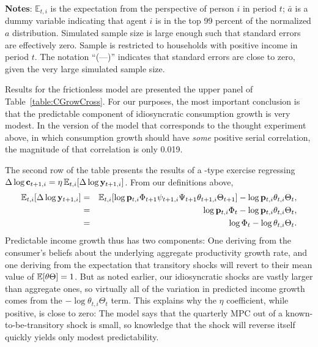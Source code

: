 \documentclass[titlepage]{./econtex}
\newlength\TableWidth
\begin{document}
\begin{minipage}{\TableWidth}
\begin{table}
\begin{flushleft}
  \footnotesize \textbf{Notes}: $\mathbb{E}_{t,i}$ is the expectation from the perspective of person $i$ in period $t$; $\bar{a}$ is a dummy variable indicating that agent $i$ is in the top 99 percent of the normalized $a$ distribution.  Simulated sample size is large enough such that standard errors are effectively zero.  Sample is restricted to households with positive income in period $t$. The notation ``(---)'' indicates that standard errors are close to zero, given the very large simulated sample size.\normalsize
\end{flushleft}

\medskip\medskip
\end{table}
\end{minipage}
 Results for the frictionless model are presented the upper panel of Table~\ref{table:CGrowCross}.
For our purposes, the most important conclusion is that the predictable component of idiosyncratic consumption growth is very modest.  In the version of the model that corresponds to the thought experiment above, in which consumption growth should have {\it some} positive serial correlation, the magnitude of that correlation is only 0.019. 

The second row of the table presents the results of a \cite{cmModel}-type exercise regressing $\Delta \log \mathbf{c}_{t+1,i} = \eta \operatorname{\mathbb{E}}_{t,i}[\Delta \log \mathbf{y}_{t+1,i}]$.  From our definitions above,
\begin{eqnarray*}
  \operatorname{\mathbb{E}}_{t,i}[\Delta \log \mathbf{y}_{t+1,i}] & = & \operatorname{\mathbb{E}}_{t,i}[\log \mathbf{p}_{t,i}\Phi_{t+1}\psi_{t+1,i}\Psi_{t+1}\theta_{t+1,i}\Theta_{t+1}] - \log \mathbf{p}_{t,i}\theta_{t,i}\Theta_{t},
  \\ & = & \log \mathbf{p}_{t,i}\Phi_{t} - \log \mathbf{p}_{t,i}\theta_{t,i}\Theta_{t},
   \\ & = & \log \Phi_{t} - \log \theta_{t,i}\Theta_{t}.
\end{eqnarray*}
Predictable income growth thus has two components: One deriving from the consumer's beliefs about the underlying aggregate productivity growth rate, and one deriving from the expectation that transitory shocks will revert to their mean value of $\operatorname{\mathbb{E}}[\theta \Theta]=1$.  But as noted earlier, our idiosyncratic shocks are vastly larger than aggregate ones, so virtually all of the variation in predicted income growth comes from the $-\log \theta_{t,i}\Theta_{t}$ term.  This explains why the $\eta$ coefficient, while positive, is close to zero: The model says that the quarterly MPC out of a known-to-be-transitory shock is small, so knowledge that the shock will reverse itself quickly yields only modest predictability.
\end{document}
